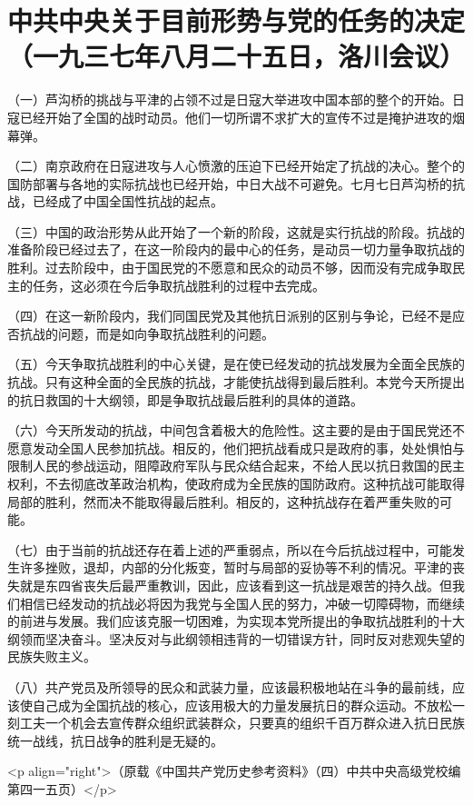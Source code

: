 \section[中共中央关于目前形势与党的任务的决定（一九三七年八月二十五日，洛川会议）]{中共中央关于目前形势与党的任务的决定（一九三七年八月二十五日，洛川会议）}


（一）芦沟桥的挑战与平津的占领不过是日寇大举进攻中国本部的整个的开始。日寇已经开始了全国的战时动员。他们一切所谓不求扩大的宣传不过是掩护进攻的烟幕弹。

（二）南京政府在日寇进攻与人心愤激的压迫下已经开始定了抗战的决心。整个的国防部署与各地的实际抗战也已经开始，中日大战不可避免。七月七日芦沟桥的抗战，已经成了中国全国性抗战的起点。

（三）中国的政治形势从此开始了一个新的阶段，这就是实行抗战的阶段。抗战的准备阶段已经过去了，在这一阶段内的最中心的任务，是动员一切力量争取抗战的胜利。过去阶段中，由于国民党的不愿意和民众的动员不够，因而没有完成争取民主的任务，这必须在今后争取抗战胜利的过程中去完成。

（四）在这一新阶段内，我们同国民党及其他抗日派别的区别与争论，已经不是应否抗战的问题，而是如向争取抗战胜利的问题。

（五）今天争取抗战胜利的中心关键，是在使已经发动的抗战发展为全面全民族的抗战。只有这种全面的全民族的抗战，才能使抗战得到最后胜利。本党今天所提出的抗日救国的十大纲领，即是争取抗战最后胜利的具体的道路。

（六）今天所发动的抗战，中间包含着极大的危险性。这主要的是由于国民党还不愿意发动全国人民参加抗战。相反的，他们把抗战看成只是政府的事，处处惧怕与限制人民的参战运动，阻障政府军队与民众结合起来，不给人民以抗日救国的民主权利，不去彻底改革政治机构，使政府成为全民族的国防政府。这种抗战可能取得局部的胜利，然而决不能取得最后胜利。相反的，这种抗战存在着严重失败的可能。

（七）由于当前的抗战还存在着上述的严重弱点，所以在今后抗战过程中，可能发生许多挫败，退却，内部的分化叛变，暂时与局部的妥协等不利的情况。平津的丧失就是东四省丧失后最严重教训，因此，应该看到这一抗战是艰苦的持久战。但我们相信已经发动的抗战必将因为我党与全国人民的努力，冲破一切障碍物，而继续的前进与发展。我们应该克服一切困难，为实现本党所提出的争取抗战胜利的十大纲领而坚决奋斗。坚决反对与此纲领相违背的一切错误方针，同时反对悲观失望的民族失败主义。

（八）共产党员及所领导的民众和武装力量，应该最积极地站在斗争的最前线，应该使自己成为全国抗战的核心，应该用极大的力量发展抗日的群众运动。不放松一刻工夫一个机会去宣传群众组织武装群众，只要真的组织千百万群众进入抗日民族统一战线，抗日战争的胜利是无疑的。

<p align="right">（原载《中国共产党历史参考资料》（四）中共中央高级党校编第四一五页）</p>

